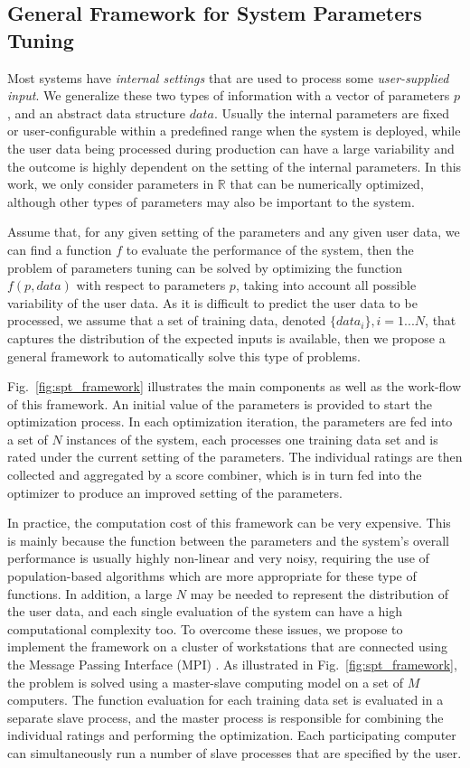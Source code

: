 \documentclass[]{spie}  %
\begin{document}
\subsection{General Framework for System Parameters Tuning}\label{framework}

Most systems have \emph{internal settings} that are used to process some \emph{user-supplied input}. We generalize these two types of information with a vector of parameters $p$, and an abstract data structure $data$. Usually the internal parameters are fixed or user-configurable within a predefined range when the system is deployed, while the user data being processed during
production can have a large variability and the outcome is highly dependent on the setting of the internal parameters. In this work, we only consider parameters in $\mathbb{R}$ that can be numerically optimized, although other types of parameters may also be important to the system.

Assume that, for any given setting of the parameters and any given user data, we can find a function $f$ to evaluate the performance of the system, then the problem of parameters tuning can be solved by optimizing the function $f(p,data)$ with respect to parameters $p$, taking into account all possible variability of the user data. As it is difficult to predict the user data to be processed, we assume that a set of training data, denoted $\{data_i\}, i=1...N$, that captures the distribution of the expected inputs is available, then we propose a general framework to automatically solve this type of problems. 

Fig.~\ref{fig:spt_framework} illustrates the main components as well as the work-flow of this framework. An initial value of the parameters is provided to start the optimization process. In each optimization iteration, the parameters are fed into a set of $N$ instances of the system, each processes one training data set and is rated under the current setting of the parameters. The individual ratings are then collected and aggregated by a score combiner, which is in turn fed into the optimizer to produce an improved setting of the parameters.

In practice, the computation cost of this framework can be very expensive. This is mainly because the function between the parameters and the system's overall performance is usually highly non-linear and very noisy, requiring the use of population-based algorithms which are more appropriate for these type of functions. In addition, a large $N$ may be needed to represent the distribution of the user data, and each single evaluation of the system can have a high computational complexity too. To overcome these issues, we propose to implement the framework on a cluster of workstations that are connected using the Message Passing Interface (MPI) \cite{SkjellumAn1994b}. As illustrated in Fig.~\ref{fig:spt_framework}, the problem is solved using a master-slave computing model on a set of $M$ computers. The function evaluation for each training data set is evaluated in a separate slave process, and the master process is responsible for combining the individual ratings and performing the optimization. Each participating computer can simultaneously run a number of slave processes that are specified by the user.
\end{document}
